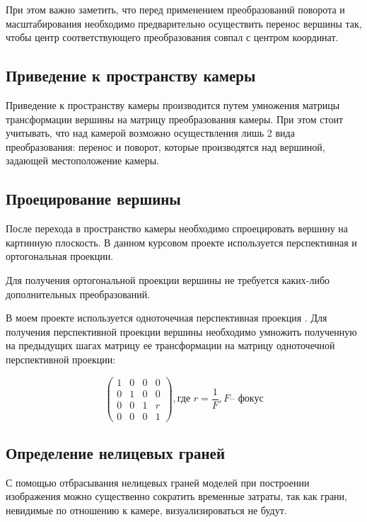 При этом важно заметить, что перед применением преобразований поворота и масштабирования необходимо предварительно осуществить перенос вершины так, чтобы центр соответствующего преобразования совпал с центром координат.

\subsection{Приведение к пространству камеры}

Приведение к пространству камеры производится путем умножения матрицы трансформации вершины на матрицу преобразования камеры. При этом стоит учитывать, что над камерой возможно осуществления лишь 2 вида преобразования: перенос и поворот, которые производятся над вершиной, задающей местоположение камеры.

\subsection{Проецирование вершины}

После перехода в пространство камеры необходимо спроецировать вершину на картинную плоскость. В данном курсовом проекте используется перспективная и ортогональная проекции.

Для получения ортогональной проекции вершины не требуется каких-либо дополнительных преобразований.

В моем проекте используется одноточечная перспективная проекция \cite{rogers_math}. Для получения перспективной проекции вершины необходимо умножить полученную на предыдущих шагах матрицу ее трансформации на матрицу одноточечной перспективной проекции:

\begin{equation}
	\begin{pmatrix}
		1 & 0 & 0 & 0 \\
		0 & 1 & 0 & 0 \\
		0 & 0 & 1 & r \\
		0 & 0 & 0 & 1
	\end{pmatrix}, \text{где } r=\frac{1}{F},F \text{-- фокус}
\end{equation}

\subsection{Определение нелицевых граней}

С помощью отбрасывания нелицевых граней моделей при построении изображения можно существенно сократить временные затраты, так как грани, невидимые по отношению к камере, визуализироваться не будут.

